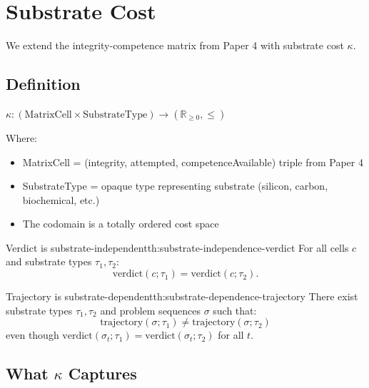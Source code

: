 \section{Substrate Cost}\label{sec:substrate-cost}

We extend the integrity-competence matrix from Paper 4 with substrate cost $\kappa$.

\subsection{Definition}

\begin{definition}\label{def:substrate-cost}
$\kappa : (\text{MatrixCell} \times \text{SubstrateType}) \to (\mathbb{R}_{\ge 0}, \leq)$

Where:
\begin{itemize}
\item MatrixCell = (integrity, attempted, competenceAvailable) triple from Paper 4
\item SubstrateType = opaque type representing substrate (silicon, carbon, biochemical, etc.)
\item The codomain is a totally ordered cost space
\end{itemize}
\end{definition}

\begin{claim}{Verdict is substrate-independent}{th:substrate-independence-verdict}
For all cells $c$ and substrate types $\tau_1, \tau_2$:
\[
\text{verdict}(c; \tau_1) = \text{verdict}(c; \tau_2).
\]
\end{claim}


\begin{claim}{Trajectory is substrate-dependent}{th:substrate-dependence-trajectory}
There exist substrate types $\tau_1, \tau_2$ and problem sequences $\sigma$ such that:
\[
\text{trajectory}(\sigma; \tau_1) \neq \text{trajectory}(\sigma; \tau_2)
\]
even though $\text{verdict}(\sigma_t; \tau_1) = \text{verdict}(\sigma_t; \tau_2)$ for all $t$.
\end{claim}


\subsection{What $\kappa$ Captures}

